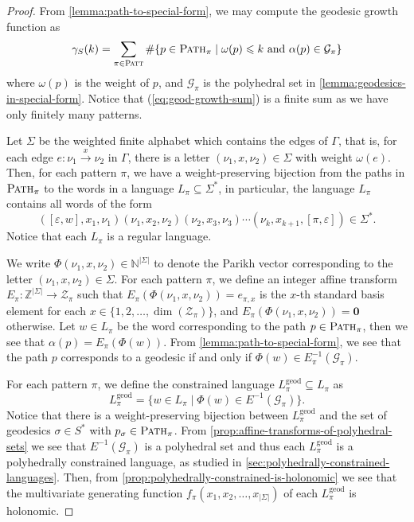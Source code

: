 \begin{proof}

From \cref{lemma:path-to-special-form}, we may compute the geodesic growth function as
\begin{equation}\label{eq:geod-growth-sum}
	\gamma_S(k)
	=
	\sum_{\pi \in \textsc{Patt}}
	\#
	\{
		p \in \textsc{Path}_\pi
	\mid
		\omega(p) \leqslant k
		\text{ and }\alpha(p) \in \mathcal{G}_\pi
	\}
\end{equation}
where $\omega(p)$ is the weight of $p$, and $\mathcal{G}_\pi$ is the polyhedral set in \cref{lemma:geodesics-in-special-form}.
Notice that (\ref{eq:geod-growth-sum}) is a finite sum as we have only finitely many patterns.

Let $\Sigma$ be the weighted finite alphabet which contains the edges of $\Gamma$, that is, for each edge $e\colon \nu_1 \xrightarrow{x} \nu_2$ in $\Gamma$, there is a letter $(\nu_1,x,\nu_2) \in \Sigma$ with weight $\omega(e)$.
Then, for each pattern $\pi$, we have a weight-preserving bijection from the paths in $\textsc{Path}_\pi$ to the words in a language $L_\pi \subseteq \Sigma^*$, in particular, the language $L_\pi$ contains all words of the form
\[
	([\varepsilon,w],x_1,\nu_1)
	(\nu_1,x_2,\nu_2)
	(\nu_2,x_3,\nu_3)
	\cdots
	(\nu_k,x_{k+1},[\pi,\varepsilon]) \in \Sigma^*.
\]
Notice that each $L_\pi$ is a regular language.

We write $\Phi(\nu_1,x,\nu_2) \in \mathbb{N}^{|\Sigma|}$ to denote the Parikh vector corresponding to the letter $(\nu_1,x,\nu_2) \in \Sigma$.
For each pattern $\pi$, we define an integer affine transform $E_\pi \colon \mathbb{Z}^{|\Sigma|} \to \mathcal{Z}_\pi$ such that $E_\pi(\Phi(\nu_1,x,\nu_2)) = e_{\pi,x}$ is the $x$-th standard basis element for each $x \in \{1,2,\ldots,\dim(\mathcal{Z}_\pi)\}$, and $E_\pi(\Phi(\nu_1,x,\nu_2)) = \mathbf{0}$ otherwise.
Let $w \in L_\pi$ be the word corresponding to the path $p \in \textsc{Path}_\pi$, then we see that $\alpha(p) = E_\pi(\Phi(w))$.
From \cref{lemma:path-to-special-form}, we see that the path $p$ corresponds to a geodesic if and only if $\Phi(w) \in E^{-1}_\pi (\mathcal{G}_\pi)$.

For each pattern $\pi$, we define the constrained language $L^\mathrm{geod}_\pi \subseteq L_\pi$ as
\[
	L_\pi^\mathrm{geod}
	=
	\{
		w \in L_\pi
	\mid
		\Phi(w) \in E^{-1}(\mathcal{G}_\pi)
	\}.
\]
Notice that there is a weight-preserving bijection between $L^\mathrm{geod}_\pi$ and the set of geodesics $\sigma \in S^*$ with $p_\sigma \in \textsc{Path}_\pi$.
From \cref{prop:affine-transforms-of-polyhedral-sets} we see that $E^{-1}(\mathcal{G}_\pi)$ is a polyhedral set and thus each $L^\mathrm{geod}_\pi$ is a polyhedrally constrained language, as studied in \cref{sec:polyhedrally-constrained-languages}.
Then, from \cref{prop:polyhedrally-constrained-is-holonomic} we see that the multivariate generating function $f_\pi(x_1,x_2,\ldots,x_{|\Sigma|})$ of each $L^\mathrm{geod}_\pi$ is holonomic.


\end{proof}
